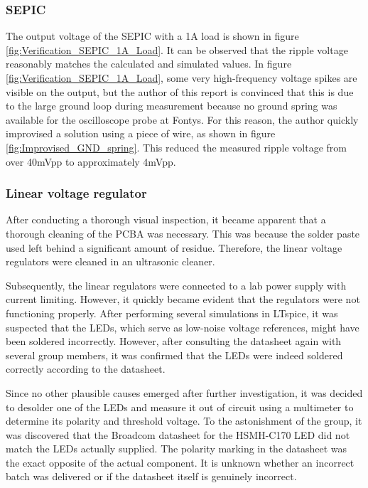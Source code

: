 \subsubsection{SEPIC}
The output voltage of the SEPIC with a 1A load is shown in figure \ref{fig:Verification_SEPIC_1A_Load}. It can be observed that the ripple voltage reasonably matches the calculated and simulated values. In figure \ref{fig:Verification_SEPIC_1A_Load}, some very high-frequency voltage spikes are visible on the output, but the author of this report is convinced that this is due to the large ground loop during measurement because no ground spring was available for the oscilloscope probe at Fontys. For this reason, the author quickly improvised a solution using a piece of wire, as shown in figure \ref{fig:Improvised_GND_spring}. This reduced the measured ripple voltage from over 40mVpp to approximately 4mVpp.

\subsubsection{Linear voltage regulator}
After conducting a thorough visual inspection, it became apparent that a thorough cleaning of the PCBA was necessary. This was because the solder paste used left behind a significant amount of residue. Therefore, the linear voltage regulators were cleaned in an ultrasonic cleaner.

Subsequently, the linear regulators were connected to a lab power supply with current limiting. However, it quickly became evident that the regulators were not functioning properly. After performing several simulations in LTspice, it was suspected that the LEDs, which serve as low-noise voltage references, might have been soldered incorrectly. However, after consulting the datasheet again with several group members, it was confirmed that the LEDs were indeed soldered correctly according to the datasheet.

Since no other plausible causes emerged after further investigation, it was decided to desolder one of the LEDs and measure it out of circuit using a multimeter to determine its polarity and threshold voltage. To the astonishment of the group, it was discovered that the Broadcom datasheet for the HSMH-C170 LED did not match the LEDs actually supplied. The polarity marking in the datasheet was the exact opposite of the actual component. It is unknown whether an incorrect batch was delivered or if the datasheet itself is genuinely incorrect.

